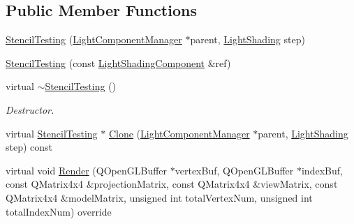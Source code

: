 \subsection*{Public Member Functions}
\begin{DoxyCompactItemize}
\item 
\mbox{\hyperlink{class_geometry_engine_1_1_light_utils_1_1_stencil_testing_a30ec1f9d091279284ebb056bc019403c}{Stencil\+Testing}} (\mbox{\hyperlink{class_geometry_engine_1_1_light_utils_1_1_light_component_manager}{Light\+Component\+Manager}} $\ast$parent, \mbox{\hyperlink{namespace_geometry_engine_1_1_light_utils_a16eb370137c2fd151e6f8e1d07cd23e0}{Light\+Shading}} step)
\item 
\mbox{\hyperlink{class_geometry_engine_1_1_light_utils_1_1_stencil_testing_aa333a1bda43da59fa905610ac120eb73}{Stencil\+Testing}} (const \mbox{\hyperlink{class_geometry_engine_1_1_light_utils_1_1_light_shading_component}{Light\+Shading\+Component}} \&ref)
\item 
\mbox{\label{class_geometry_engine_1_1_light_utils_1_1_stencil_testing_aa443506d090e9a9ca9ea166d11d71f0e}} 
virtual \mbox{\hyperlink{class_geometry_engine_1_1_light_utils_1_1_stencil_testing_aa443506d090e9a9ca9ea166d11d71f0e}{$\sim$\+Stencil\+Testing}} ()
\begin{DoxyCompactList}\small\item\em Destructor. \end{DoxyCompactList}\item 
virtual \mbox{\hyperlink{class_geometry_engine_1_1_light_utils_1_1_stencil_testing}{Stencil\+Testing}} $\ast$ \mbox{\hyperlink{class_geometry_engine_1_1_light_utils_1_1_stencil_testing_a213b9b0be58d6f4481465abfbcc15cfb}{Clone}} (\mbox{\hyperlink{class_geometry_engine_1_1_light_utils_1_1_light_component_manager}{Light\+Component\+Manager}} $\ast$parent, \mbox{\hyperlink{namespace_geometry_engine_1_1_light_utils_a16eb370137c2fd151e6f8e1d07cd23e0}{Light\+Shading}} step) const
\item 
virtual void \mbox{\hyperlink{class_geometry_engine_1_1_light_utils_1_1_stencil_testing_a5b6025533f2fa86ca69e8f91709ce418}{Render}} (Q\+Open\+G\+L\+Buffer $\ast$vertex\+Buf, Q\+Open\+G\+L\+Buffer $\ast$index\+Buf, const Q\+Matrix4x4 \&projection\+Matrix, const Q\+Matrix4x4 \&view\+Matrix, const Q\+Matrix4x4 \&model\+Matrix, unsigned int total\+Vertex\+Num, unsigned int total\+Index\+Num) override
\end{DoxyCompactItemize}
